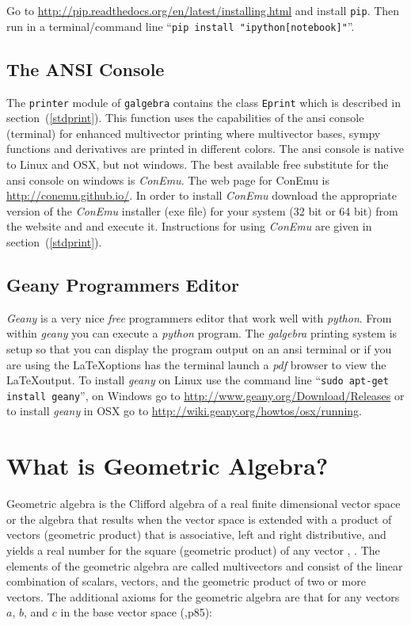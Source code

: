 \documentclass[12pt]{report}
\newcommand{\T}[1]{\texttt{#1}}
\begin{document}
Go to \url{http://pip.readthedocs.org/en/latest/installing.html} and install \T{pip}.  Then run in a terminal/command line
``\T{pip install "ipython[notebook]"}''.

\section{The ANSI Console}

The \T{printer} module of \T{galgebra} contains the class \T{Eprint} which is described in section~(\ref{stdprint}). This function uses
the capabilities of the ansi console (terminal) for enhanced multivector printing where multivector bases, sympy functions and derivatives
are printed in different colors.  The ansi console is native to Linux and OSX, but not windows.  The best available free substitute for
the ansi console on windows is \emph{ConEmu}.  The web page for ConEmu is \url{http://conemu.github.io/}.  In order to install \emph{ConEmu}
download the appropriate version of the \emph{ConEmu} installer (exe file) for your system (32 bit or 64 bit) from the website and and execute it. Instructions for using \emph{ConEmu} are given in section~(\ref{stdprint}).

\section{Geany Programmers Editor}

\emph{Geany} is a very nice \emph{free} programmers editor that work well with \emph{python}.  From within \emph{geany} you can execute a
\emph{python} program.  The \emph{galgebra} printing system is setup so that you can display the program output on an ansi terminal or if
you are using the \LaTeX options has the terminal launch a \emph{pdf} browser to view the \LaTeX output.  To install \emph{geany} on
Linux use the command line ``\T{sudo apt-get install geany}'', on Windows go to \url{http://www.geany.org/Download/Releases} or to install
\emph{geany} in OSX go to \url{http://wiki.geany.org/howtos/osx/running}.

\chapter{What is Geometric Algebra?}

Geometric algebra is the Clifford algebra of a real finite dimensional vector
space or the algebra that results when the vector space
is extended with a product of vectors (geometric product) that is associative,
left and right distributive, and yields a real number for the square (geometric
product) of any vector \cite{Hestenes}, \cite{Doran}.  The elements of the geometric
algebra are called multivectors and consist of the linear combination of
scalars, vectors, and the geometric product of two or more vectors. The
additional axioms for the geometric algebra are that for any vectors $a$,
$b$, and $c$ in the base vector space (\cite{Doran},p85):
\end{document}
